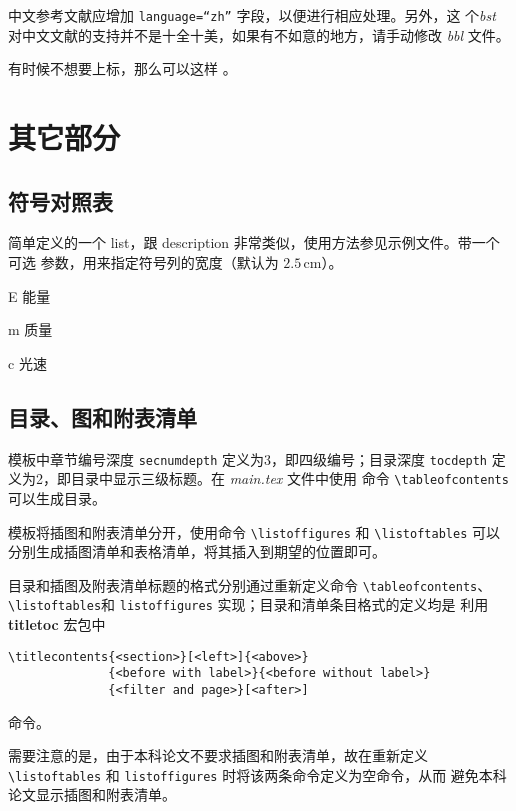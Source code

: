 中文参考文献应增加 \texttt{language=``zh''} 字段，以便进行相应处理。另外，这
个\emph{bst} 对中文文献的支持并不是十全十美，如果有不如意的地方，请手动修改
\emph{bbl} 文件。

有时候不想要上标，那么可以这样 。

\section{其它部分}
\label{sec:otherparts}

\subsection*{符号对照表}

简单定义的一个 list，跟 description 非常类似，使用方法参见示例文件。带一个可选
参数，用来指定符号列的宽度（默认为 $2.5\,\mathrm{cm}$）。
\begin{code}
\begin{denotation}[1.5cm]
  \item[E] 能量
  \item[m] 质量
  \item[c] 光速
\end{denotation}
\end{code}

\subsection*{目录、图和附表清单}

模板中章节编号深度 \texttt{secnumdepth} 定义为3，即四级编号；目录深度
\texttt{tocdepth} 定义为2，即目录中显示三级标题。在 \emph{main.tex} 文件中使用
命令 \verb|\tableofcontents|可以生成目录。

模板将插图和附表清单分开，使用命令 \verb|\listoffigures| 和 \verb|\listoftables|
可以分别生成插图清单和表格清单，将其插入到期望的位置即可。

目录和插图及附表清单标题的格式分别通过重新定义命令 \verb|\tableofcontents|、
\verb|\listoftables|和 \verb|listoffigures| 实现；目录和清单条目格式的定义均是
利用 \textbf{titletoc} 宏包中\\
\begin{verbatim}
\titlecontents{<section>}[<left>]{<above>}
              {<before with label>}{<before without label>}
              {<filter and page>}[<after>]
\end{verbatim}
命令。

需要注意的是，由于本科论文不要求插图和附表清单，故在重新定义
\verb|\listoftables| 和 \verb|listoffigures| 时将该两条命令定义为空命令，从而
避免本科论文显示插图和附表清单。

